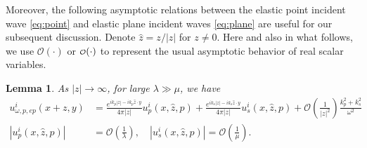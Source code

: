 \documentclass[a4paper,11pt]{article}
\newcommand{\mO}{\mathcal{O}}
\newcommand\smallO{
  \mathchoice
    {{\scriptstyle\mathcal{O}}}%
    {{\scriptstyle\mathcal{O}}}%
    {{\scriptscriptstyle\mathcal{O}}}%
    {\scalebox{.7}{$\scriptscriptstyle\mathcal{O}$}}%
  }
\newtheorem{lemma}{Lemma}[section]
\theoremstyle{remark}
\theoremstyle{definition}
\numberwithin{equation}{section}
\begin{document}
Moreover, the following asymptotic relations between the elastic point incident wave \eqref{eq:point} and elastic plane incident waves \eqref{eq:plane} are useful for our subsequent discussion. Denote $\hat{z} = z/|z|$ for $z\neq 0$. Here and also in what follows, we use $\mO(\cdot)$ or $\smallO(\cdot)$ to represent the usual asymptotic behavior of real scalar variables.
\begin{lemma}\label{lem:incident}
As $|z| \rightarrow \infty$, for large $\lambda \gg \mu$, we have
\begin{align}
 u_{\omega,p,ep}^{i}(x+z,y) &= \frac{e^{ik_p|z|-ik_p\hat{z} \cdot y}}{4 \pi |z|}u_{p}^{i}(x,\hat{z},p)+
\frac{e^{ik_s|z|-ik_s\hat{z} \cdot y}}{4 \pi |z|}u_{s}^{i}(x,\hat{z},p) + \mO(\frac{1}{|z|^2})\frac{k_p^2 + k_s^2}{\omega^2} \label{eq:asym:point1}\\
|u_{p}^{i}(x,\hat{z},p)|& = \mO(\frac{1}{\lambda}), \quad |u_{s}^{i}(x,\hat{z},p)| = \mO(\frac{1}{\mu}). \label{eq:asym:plane:incident}
\end{align}
\end{lemma}
\end{document}
